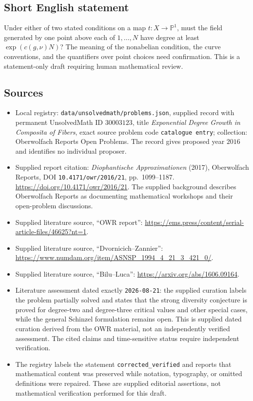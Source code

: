 \documentclass[11pt]{article}
\newcommand{\PP}{\mathbb{P}}
\begin{document}
\subsection{Short English statement}
Under either of two stated conditions on a map \(t:X\to\PP^1\), must the field generated by one point above each of \(1,\ldots,N\) have degree at least \(\exp(c(g,\nu)N)\)? The meaning of the nonabelian condition, the curve conventions, and the quantifiers over point choices need confirmation. This is a statement-only draft requiring human mathematical review.
\subsection{Sources}
\begin{itemize}
\item Local registry: \texttt{data/unsolvedmath/problems.json}, supplied record with permanent UnsolvedMath ID \(30003123\), title \emph{Exponential Degree Growth in Composita of Fibers}, exact source problem code \texttt{catalogue entry}; collection: Oberwolfach Reports Open Problems. The record gives proposed year \(2016\) and identifies no individual proposer.
\item Supplied report citation: \emph{Diophantische Approximationen} (2017), Oberwolfach Reports, DOI \texttt{10.4171/owr/2016/21}, pp.\ 1099--1187. \url{https://doi.org/10.4171/owr/2016/21}. The supplied background describes Oberwolfach Reports as documenting mathematical workshops and their open-problem discussions.
\item Supplied literature source, ``OWR report'': \url{https://ems.press/content/serial-article-files/46625?nt=1}.
\item Supplied literature source, ``Dvornicich--Zannier'': \url{https://www.numdam.org/item/ASNSP_1994_4_21_3_421_0/}.
\item Supplied literature source, ``Bilu--Luca'': \url{https://arxiv.org/abs/1606.09164}.
\item Literature assessment dated exactly \texttt{2026-08-21}: the supplied curation labels the problem partially solved and states that the strong diversity conjecture is proved for degree-two and degree-three critical values and other special cases, while the general Schinzel formulation remains open. This is supplied dated curation derived from the OWR material, not an independently verified assessment. The cited claims and time-sensitive status require independent verification.
\item The registry labels the statement \texttt{corrected\_verified} and reports that mathematical content was preserved while notation, typography, or omitted definitions were repaired. These are supplied editorial assertions, not mathematical verification performed for this draft.
\end{itemize}
\end{document}
